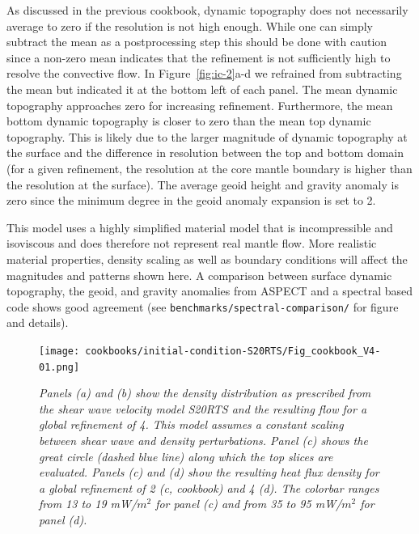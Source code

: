 \documentclass{article}
\begin{document}
As discussed in the previous cookbook, dynamic topography does not necessarily 
average to zero if the resolution is not high enough. While one can simply subtract
the mean as a postprocessing step this should be done with caution since a non-zero
mean indicates that the refinement is not sufficiently high to resolve the
convective flow. In Figure~\ref{fig:ic-2}a-d we refrained from subtracting the mean but 
indicated it at the bottom left of each panel. The mean dynamic 
topography approaches zero for increasing refinement. Furthermore, the mean bottom 
dynamic topography is closer to zero than the mean top dynamic topography. This is 
likely due to the larger magnitude of dynamic topography at the surface and the
difference in resolution between the top and bottom domain
(for a given refinement, the resolution at the core mantle boundary is
higher than the resolution at the surface). The average geoid height and gravity anomaly 
is zero since the minimum degree in the geoid anomaly expansion is set to 2. 

This model uses a highly simplified material model that is incompressible and 
isoviscous and does therefore not represent real mantle flow. More realistic 
material properties, density scaling as well as boundary conditions will affect the magnitudes
and patterns shown here. A comparison between surface dynamic topography, the geoid,
and gravity anomalies from ASPECT and a spectral based code shows good agreement 
(see \texttt{benchmarks/spectral-comparison/} for figure and details).

\begin{figure}
  \texttt{[image: cookbooks/initial-condition-S20RTS/Fig\_cookbook\_V4-01.png]}
  \hfill
  \caption{\it Panels (a) and (b) show the density distribution as prescribed from the shear
  wave velocity model S20RTS and the resulting flow for a global refinement of 4. This
  model assumes a constant scaling between shear wave and density perturbations.
  Panel (c) shows the great circle (dashed blue line) along which the top slices
  are evaluated. Panels (c) and (d) show the resulting heat flux density for a global refinement of
  2 (c, cookbook) and 4 (d). The colorbar ranges from 13 to 19 mW/$m^2$ for panel (c) and
  from 35 to 95 mW/$m^2$ for panel (d).}
  \label{fig:ic-1}
\end{figure}
\end{document}
